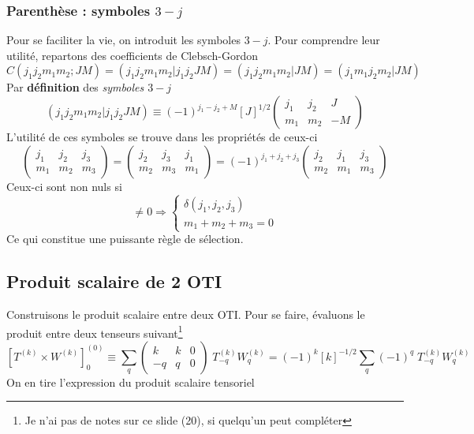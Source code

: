 \subsubsection*{Parenthèse : symboles $3-j$}
Pour se faciliter la vie, on introduit les symboles $3-j$. Pour comprendre leur utilité, repartons
des coefficients de Clebsch-Gordon
\begin{equation}
C(j_1 j_2 m_1 m_2; J M) 
= ( j_1 j_2 m_1 m_2 \vert j_1 j_2 J M)= ( j_1 j_2 m_1 m_2 \vert  J M) 
= ( j_1 m_1 j_2 m_2 \vert  J M)
\end{equation}
Par \textbf{définition} des \textit{symboles $3-j$}
\begin{equation}
( j_1 j_2 m_1 m_2 \vert j_1 j_2 J M)
\equiv
(-1)^{j_1 - j_2 + M} [ J ]^{1/2} 
\left( \begin{array}{ccc} j_1 & j_2 & J \\ m_1 & m_2 & -M \end{array} 
\right) 
\end{equation}
L'utilité de ces symboles se trouve dans les propriétés de ceux-ci
\begin{equation}
\left( 
\begin{array}{ccc} j_1 & j_2 & j_3 \\ m_1 & m_2 & m_3 \end{array} 
\right) 
= 
\left( 
\begin{array}{ccc} j_2 & j_3 & j_1 \\ m_2 & m_3 & m_1 \end{array} 
\right)= (-1)^{j_1 + j_2 + j_3}
\left( 
\begin{array}{ccc} j_2 & j_1 & j_3 \\ m_2 & m_1 & m_3 \end{array} 
\right)
\end{equation}
Ceux-ci sont non nuls si
\begin{equation}
 \neq 0 \Rightarrow \left\{
\begin{array}{l}
\delta(j_1,j_2,j_3) \\
m_1 + m_2 + m_3 = 0
\end{array}  \right.
\end{equation}
Ce qui constitue une puissante règle de sélection.

\subsection{Produit scalaire de 2 OTI}
Construisons le produit scalaire entre deux OTI. Pour se faire, évaluons le produit entre deux
tenseurs suivant\footnote{Je n'ai pas de notes sur ce slide (20), si quelqu'un peut compléter}
\begin{equation}
\left[ T^{(k)} \times W^{(k)} \right]^{(0)}_0 \equiv
\sum_{q} 
\left( \begin{array}{ccc} k & k & 0 \\ -q & q & 0 \end{array} 
\right)  \; T^{(k)}_{-q} W^{(k)}_{q}
= (-1)^k [k]^{-1/2} \sum_q (-1)^q \; T^{(k)}_{-q} W^{(k)}_{q}
\end{equation}
On en tire l'expression du produit scalaire tensoriel\\

